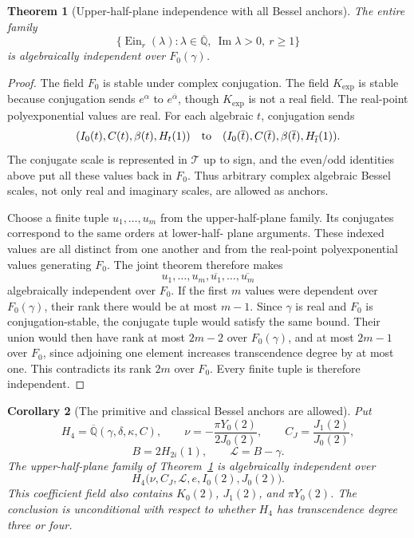 \documentclass[11pt]{article}
\newtheorem{theorem}{Theorem}[section]
\newtheorem{corollary}[theorem]{Corollary}
\theoremstyle{definition}
\theoremstyle{remark}
\newcommand{\Ein}{\operatorname{Ein}}
\begin{document}
\begin{theorem}[Upper-half-plane independence with all Bessel anchors]
\label{anchor:main}
The entire family
\[
 \{\Ein_r(\lambda):
       \lambda\in\overline{\mathbb Q},\ \operatorname{Im}\lambda>0,
       \ r\ge1\}
\]
is algebraically independent over $F_0(\gamma)$.
\end{theorem}

\begin{proof}
The field $F_0$ is stable under complex conjugation. The field
$K_{\exp}$ is stable because conjugation sends $e^\alpha$ to
$e^{\overline\alpha}$, though $K_{\exp}$ is not a real field.
The real-point polyexponential values are real. For each algebraic
$t$, conjugation sends
\[
 (I_0(t),C(t),\beta(t),H_t(1))
 \quad\hbox{to}\quad
 (I_0(\overline t),C(\overline t),\beta(\overline t),H_{\overline t}(1)).
\]
The conjugate scale is represented in $\mathcal T$ up to sign, and
the even/odd identities above put all these values back in $F_0$.
Thus arbitrary complex algebraic Bessel scales, not only real and
imaginary scales, are allowed as anchors.

Choose a finite tuple $u_1,\ldots,u_m$ from the upper-half-plane
family. Its conjugates correspond to the same orders at lower-half-
plane arguments. These indexed values are all distinct from one
another and from the real-point polyexponential values generating
$F_0$. The joint theorem therefore makes
\[
       u_1,\ldots,u_m,\overline{u_1},\ldots,\overline{u_m}
\]
algebraically independent over $F_0$. If the first $m$ values were
dependent over $F_0(\gamma)$, their rank there would be at most
$m-1$. Since $\gamma$ is real and $F_0$ is conjugation-stable,
the conjugate tuple would satisfy the same bound. Their union
would then have rank at most $2m-2$ over $F_0(\gamma)$, and at most
$2m-1$ over $F_0$, since adjoining one element increases
transcendence degree by at most one. This contradicts its rank
$2m$ over $F_0$. Every finite tuple is therefore independent.
\end{proof}

\begin{corollary}[The primitive and classical Bessel anchors are allowed]
\label{anchor:explicit}
Put
\[
 H_4=\overline{\mathbb Q}(\gamma,\delta,\kappa,C),\qquad
 \nu=-\frac{\pi Y_0(2)}{2J_0(2)},\qquad C_J=\frac{J_1(2)}{J_0(2)},
\]
\[
 B=2H_{2i}(1),\qquad \mathcal L=B-\gamma.
\]
The upper-half-plane family of Theorem~\ref{anchor:main} is
algebraically independent over
\begin{equation}\label{anchor:explicit-field}
 H_4\bigl(\nu,C_J,\mathcal L,e,I_0(2),J_0(2)\bigr).
\end{equation}
This coefficient field also contains $K_0(2)$, $J_1(2)$, and
$\pi Y_0(2)$. The conclusion is unconditional with respect to
whether $H_4$ has transcendence degree three or four.
\end{corollary}
\end{document}
